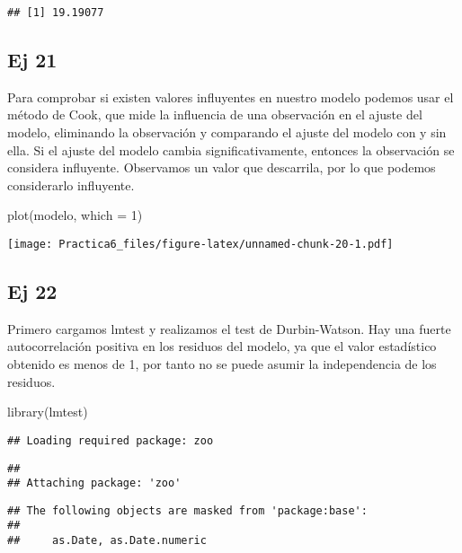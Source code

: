 \documentclass[
]{article}
\newenvironment{Shaded}{\begin{snugshade}}{\end{snugshade}}
\newcommand{\AttributeTok}[1]{\textcolor[rgb]{0.77,0.63,0.00}{#1}}
\newcommand{\DecValTok}[1]{\textcolor[rgb]{0.00,0.00,0.81}{#1}}
\newcommand{\FunctionTok}[1]{\textcolor[rgb]{0.00,0.00,0.00}{#1}}
\newcommand{\NormalTok}[1]{#1}
\begin{document}
\begin{verbatim}
## [1] 19.19077
\end{verbatim}

\hypertarget{ej-21}{%
\subsection{Ej 21}\label{ej-21}}

Para comprobar si existen valores influyentes en nuestro modelo podemos
usar el método de Cook, que mide la influencia de una observación en el
ajuste del modelo, eliminando la observación y comparando el ajuste del
modelo con y sin ella. Si el ajuste del modelo cambia
significativamente, entonces la observación se considera influyente.
Observamos un valor que descarrila, por lo que podemos considerarlo
influyente.

\begin{Shaded}
\begin{Highlighting}[]
\FunctionTok{plot}\NormalTok{(modelo, }\AttributeTok{which =} \DecValTok{1}\NormalTok{)}
\end{Highlighting}
\end{Shaded}

\texttt{[image: Practica6\_files/figure-latex/unnamed-chunk-20-1.pdf]}

\hypertarget{ej-22}{%
\subsection{Ej 22}\label{ej-22}}

Primero cargamos lmtest y realizamos el test de Durbin-Watson. Hay una
fuerte autocorrelación positiva en los residuos del modelo, ya que el
valor estadístico obtenido es menos de 1, por tanto no se puede asumir
la independencia de los residuos.

\begin{Shaded}
\begin{Highlighting}[]
\FunctionTok{library}\NormalTok{(lmtest)}
\end{Highlighting}
\end{Shaded}

\begin{verbatim}
## Loading required package: zoo
\end{verbatim}

\begin{verbatim}
## 
## Attaching package: 'zoo'
\end{verbatim}

\begin{verbatim}
## The following objects are masked from 'package:base':
## 
##     as.Date, as.Date.numeric
\end{verbatim}
\end{document}
